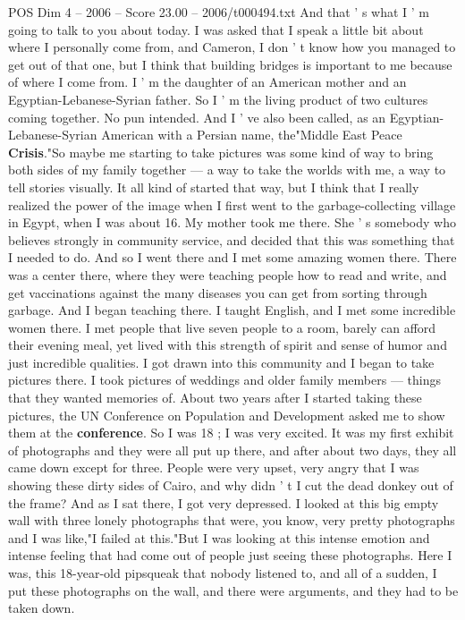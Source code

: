 \begin{textsample}{POS Dim 4 – 2006 – Score 23.00 – 2006/t000494.txt}
And that ' s what I ' m going to talk to you about today.
I was asked that I speak a little bit about where I personally come from, and Cameron, I don ' t know how you managed to get out of that one, but I think that building bridges is important to me because of where I come from.
I ' m the daughter of an American mother and an Egyptian-Lebanese-Syrian father.
So I ' m the living product of two cultures coming together.
No pun intended.
And I ' ve also been called, as an Egyptian-Lebanese-Syrian American with a Persian name, the"Middle East Peace \textbf{Crisis}."So maybe me starting to take pictures was some kind of way to bring both sides of my family together — a way to take the worlds with me, a way to tell stories visually.
It all kind of started that way, but I think that I really realized the power of the image when I first went to the garbage-collecting village in Egypt, when I was about 16.
My mother took me there.
She ' s somebody who believes strongly in community service, and decided that this was something that I needed to do.
And so I went there and I met some amazing women there.
There was a center there, where they were teaching people how to read and write, and get vaccinations against the many diseases you can get from sorting through garbage.
And I began teaching there.
I taught English, and I met some incredible women there.
I met people that live seven people to a room, barely can afford their evening meal, yet lived with this strength of spirit and sense of humor and just incredible qualities.
I got drawn into this community and I began to take pictures there.
I took pictures of weddings and older family members — things that they wanted memories of.
About two years after I started taking these pictures, the UN Conference on Population and Development asked me to show them at the \textbf{conference}.
So I was 18 ; I was very excited.
It was my first exhibit of photographs and they were all put up there, and after about two days, they all came down except for three.
People were very upset, very angry that I was showing these dirty sides of Cairo, and why didn ' t I cut the dead donkey out of the frame?
And as I sat there, I got very depressed.
I looked at this big empty wall with three lonely photographs that were, you know, very pretty photographs and I was like,"I failed at this."But I was looking at this intense emotion and intense feeling that had come out of people just seeing these photographs.
Here I was, this 18-year-old pipsqueak that nobody listened to, and all of a sudden, I put these photographs on the wall, and there were arguments, and they had to be taken down.

\end{textsample}
